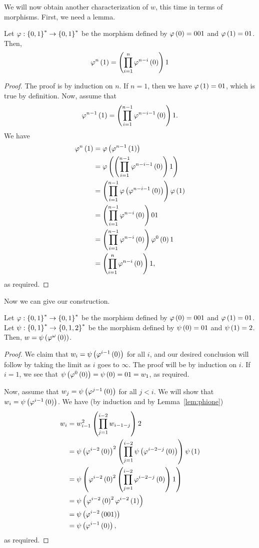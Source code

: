 \documentclass[english,12pt]{article}
\begin{document}
We will now obtain another characterization of $w$, this time
in terms of morphisms.
First, we need a lemma.
\begin{lemma}\label{lem:phione}
Let $\varphi:\left\{0,1\right\}^*\to\left\{0,1\right\}^*$ be the morphism defined by $\varphi\left(0\right)=001$ and $\varphi\left(1\right)=01$.  Then,
\[
\varphi^n\left(1\right)=\left(\prod_{i=1}^{n}\varphi^{n-i}\left(0\right)\right)1
\]
\end{lemma}
\begin{proof}
The proof is by induction on $n$.  If $n=1$, then we have $\varphi\left(1\right)=01$, which is true by definition.  Now, assume that
\[
\varphi^{n-1}\left(1\right)=\left(\prod_{i=1}^{n-1}\varphi^{n-i-1}\left(0\right)\right)1.
\]
We have
\begin{align*}
\varphi^n\left(1\right)&=\varphi\left(\varphi^{n-1}\left(1\right)\right)\\
&=\varphi\left(\left(\prod_{i=1}^{n-1}\varphi^{n-i-1}\left(0\right)\right)1\right)\\
&=\left(\prod_{i=1}^{n-1}\varphi\left(\varphi^{n-i-1}\left(0\right)\right)\right)\varphi\left(1\right)\\
&=\left(\prod_{i=1}^{n-1}\varphi^{n-i}\left(0\right)\right)01\\
&=\left(\prod_{i=1}^{n-1}\varphi^{n-i}\left(0\right)\right)\varphi^0\left(0\right)1\\
&=\left(\prod_{i=1}^n\varphi^{n-i}\left(0\right)\right)1,
\end{align*}
as required.
\end{proof}
Now we can give our construction.
\begin{prop}\label{prop:hd0l}
Let $\varphi:\left\{0,1\right\}^*\to\left\{0,1\right\}^*$ be the morphism defined by $\varphi\left(0\right)=001$ and $\varphi\left(1\right)=01$.  Let $\psi:\left\{0,1\right\}^*\to\left\{0,1,2\right\}^*$ be the morphism defined by $\psi\left(0\right)=01$ and $\psi\left(1\right)=2$.  Then, $w=\psi\left(\varphi^\omega\left(0\right)\right)$.
\end{prop}
\begin{proof}
We claim that $w_i=\psi\left(\varphi^{i-1}\left(0\right)\right)$ for all $i$, and our desired conclusion will follow by taking the limit as $i$ goes to $\infty$.  The proof will be by induction on $i$.  If $i=1$, we see that $\psi\left(\varphi^0\left(0\right)\right)=\psi\left(0\right)=01=w_1$, as required.

Now, assume that $w_j=\psi\left(\varphi^{j-1}\left(0\right)\right)$ for all $j<i$.  We will show that $w_i=\psi\left(\varphi^{i-1}\left(0\right)\right)$.  We have (by induction and by Lemma~\ref{lem:phione})
\begin{align*}
w_i&=w_{i-1}^2\left(\prod_{j=1}^{i-2}w_{i-1-j}\right)2\\
&=\psi\left(\varphi^{i-2}\left(0\right)\right)^2\left(\prod_{j=1}^{i-2}\psi\left(\varphi^{i-2-j}\left(0\right)\right)\right)\psi\left(1\right)\\
&=\psi\left(\varphi^{i-2}\left(0\right)^2\left(\prod_{j=1}^{i-2}\varphi^{i-2-j}\left(0\right)\right)1\right)\\
&=\psi\left(\varphi^{i-2}\left(0\right)^2\varphi^{i-2}\left(1\right)\right)\\
&=\psi\left(\varphi^{i-2}\left(001\right)\right)\\
&=\psi\left(\varphi^{i-1}\left(0\right)\right),
\end{align*}
as required.
\end{proof}
\end{document}
